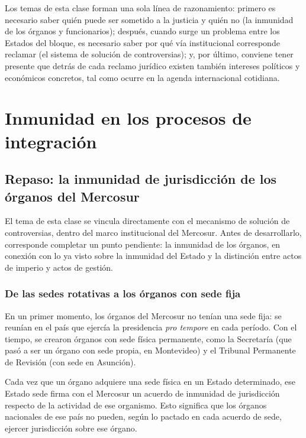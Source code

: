 \documentclass[12pt,oneside]{book}
\begin{document}
Los temas de esta clase forman una sola línea de razonamiento: primero es necesario saber quién puede ser sometido a la justicia y quién no (la inmunidad de los órganos y funcionarios); después, cuando surge un problema entre los Estados del bloque, es necesario saber por qué vía institucional corresponde reclamar (el sistema de solución de controversias); y, por último, conviene tener presente que detrás de cada reclamo jurídico existen también intereses políticos y económicos concretos, tal como ocurre en la agenda internacional cotidiana.

\chapter{Inmunidad en los procesos de integración}

\section{Repaso: la inmunidad de jurisdicción de los órganos del Mercosur}

El tema de esta clase se vincula directamente con el mecanismo de solución de controversias, dentro del marco institucional del Mercosur. Antes de desarrollarlo, corresponde completar un punto pendiente: la inmunidad de los órganos, en conexión con lo ya visto sobre la inmunidad del Estado y la distinción entre actos de imperio y actos de gestión.

\subsection{De las sedes rotativas a los órganos con sede fija}

En un primer momento, los órganos del Mercosur no tenían una sede fija: se reunían en el país que ejercía la presidencia \textit{pro tempore} en cada período. Con el tiempo, se crearon órganos con sede física permanente, como la Secretaría (que pasó a ser un órgano con sede propia, en Montevideo) y el Tribunal Permanente de Revisión (con sede en Asunción).

Cada vez que un órgano adquiere una sede física en un Estado determinado, ese Estado sede firma con el Mercosur un acuerdo de inmunidad de jurisdicción respecto de la actividad de ese organismo. Esto significa que los órganos nacionales de ese país no pueden, según lo pactado en cada acuerdo de sede, ejercer jurisdicción sobre ese órgano.
\end{document}
